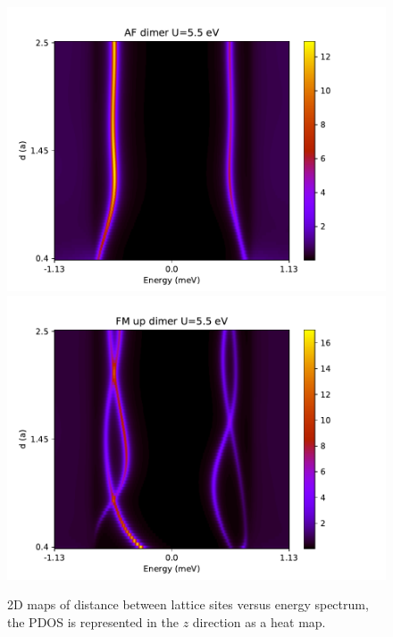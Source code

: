 \documentclass[letterpaper,12pt]{article}
\begin{document}
\begin{figure}[h!]
    \includegraphics[scale = .5]{AF_dimer_U5_5.pdf}
    \includegraphics[scale = .5]{FM_dimer_U5_5.pdf}
    
    \caption{2D maps of distance between lattice sites versus energy spectrum, the PDOS is represented in the $z$ direction as a heat map.}
    \label{dimernoSOC}
\end{figure}
\end{document}
